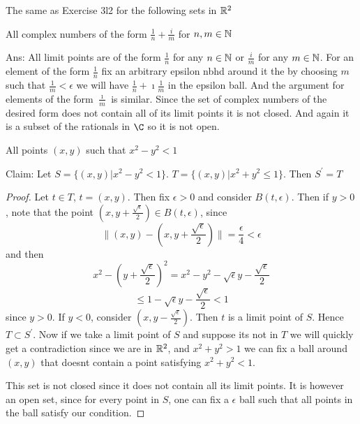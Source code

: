     \question 
    The same as Exercise 3l2 for the following sets in $\mathbb{R}^2$ 

    \begin{alphaparts}
        \questionpart 
        All complex numbers of the form $\frac{1}{n} + \frac{i}{m}$ for $n, m \in \mathbb{N}$ 

        Ans: 
        All limit points are of the form $\frac{1}{n}$ for any $n \in \mathbb{N}$ or $\frac{i}{m}$ for any $m \in \mathbb{N}$. 
        For an element of the form $\frac{1}{n}$ fix an arbitrary epsilon nbhd around it the by choosing $m$ such that 
        $\frac{1}{m} < \epsilon$ we will have $\frac{1}{n} + \imath \frac{1}{m}$ in the epsilon ball. And the argument for 
        elements of the form $\frac{\imath}{m}$ is similar. Since the set of complex numbers of the desired form does not contain all of 
        its limit points it is not closed. And again it is a subset of the rationals in $\C$ so it is not open. 
        
        \questionpart
        All points $(x, y) $ such that $x^2 - y^2 < 1$ 

        Claim: Let $S = \{(x, y) | x^2 - y^2 < 1\}$. 
         $T = \{(x, y) | x^2 + y^2 \leq 1\}$.
         Then $S^\prime = T$


         \begin{proof}
            Let $t \in T$, $t = (x, y)$. Then fix $\epsilon > 0$ and consider $B(t, \epsilon)$. 
            Then if $y > 0$, note that the point $(x, y + \frac{\sqrt{\epsilon}}{2}) \in B(t, \epsilon)$, 
            since 
            \[ \| (x, y) - (x, y + \frac{\sqrt{\epsilon}}{2}) \| = \frac{\epsilon}{4} < \epsilon \]
            and then 
            \[x^2 - (y + \frac{\sqrt{\epsilon}}{2})^2 = x^2 - y^2 - \sqrt{\epsilon}y - \frac{\sqrt{\epsilon}}{2}\]
            \[\leq 1 - \sqrt{\epsilon}y - \frac{\sqrt{\epsilon}}{2} < 1\]
            since $y > 0$. If $y < 0$, consider $(x, y - \frac{\sqrt{\epsilon}}{2})$. 
            Then $t$ is a limit point of $S$. Hence $T \subset S^\prime$. 
            Now if we take a limit point of $S$ and suppose its not in $T$ we will quickly get a contradiction 
            since we are in $\mathbb{R}^2$, and $x^2 + y^2 > 1$ we can fix a ball around $(x, y)$ that doesnt contain a point 
            satisfying $x^2 + y^2 < 1$. 

            This set is not closed since it does not contain all its limit points. It is however an open set, 
            since for every point in $S$, one can fix a $\epsilon$ ball such that all points in the ball satisfy our condition. 


\end{proof}
\end{alphaparts}
